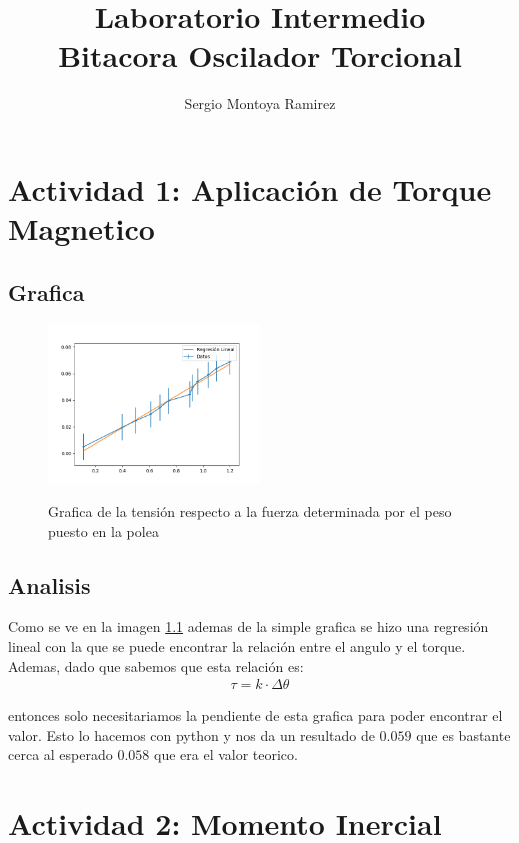 \documentclass{report}
\title{\Huge{Laboratorio Intermedio}\\Bitacora Oscilador Torcional}
\author{\huge{Sergio Montoya Ramirez}}
\date{}
\begin{document}
\maketitle
\newpage%
\tableofcontents
\pagebreak

\chapter{Actividad 1: Aplicación de Torque Magnetico}

\section{Grafica}
\begin{figure}[H]
	\caption{Grafica de la tensión respecto a la fuerza determinada por el peso puesto en la polea}
	\centering
	\includegraphics[width=0.5\textwidth]{../Analisis/Graficas/actividad1.png}
	\label{graphics/actividad1}
\end{figure}

\section{Analisis}

Como se ve en la imagen \ref{graphics/actividad1} ademas de la simple grafica se hizo una regresión lineal con la que se puede encontrar la relación entre el angulo y el torque. Ademas, dado que sabemos que esta relación es:
\begin{align*}
	\tau = k\cdot \Delta\theta
\end{align*}

entonces solo necesitariamos la pendiente de esta grafica para poder encontrar el valor. Esto lo hacemos con python y nos da un resultado de $0.059$ que es bastante cerca al esperado $0.058$ que era el valor teorico.

\chapter{Actividad 2: Momento Inercial}
\end{document}
